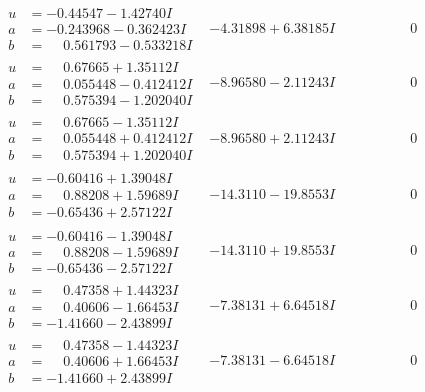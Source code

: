 \documentclass[1p]{elsarticle_modified}
\theoremstyle{definition}
\begin{document}
$$\begin{array}{c|c|c}
\begin{aligned}
u &= -0.44547 - 1.42740 I \\
a &= -0.243968 - 0.362423 I \\
b &= \phantom{-}0.561793 - 0.533218 I\end{aligned}
 & -4.31898 + 6.38185 I & \phantom{-0.000000 } 0 \\ \hline\begin{aligned}
u &= \phantom{-}0.67665 + 1.35112 I \\
a &= \phantom{-}0.055448 - 0.412412 I \\
b &= \phantom{-}0.575394 - 1.202040 I\end{aligned}
 & -8.96580 - 2.11243 I & \phantom{-0.000000 } 0 \\ \hline\begin{aligned}
u &= \phantom{-}0.67665 - 1.35112 I \\
a &= \phantom{-}0.055448 + 0.412412 I \\
b &= \phantom{-}0.575394 + 1.202040 I\end{aligned}
 & -8.96580 + 2.11243 I & \phantom{-0.000000 } 0 \\ \hline\begin{aligned}
u &= -0.60416 + 1.39048 I \\
a &= \phantom{-}0.88208 + 1.59689 I \\
b &= -0.65436 + 2.57122 I\end{aligned}
 & -14.3110 - 19.8553 I & \phantom{-0.000000 } 0 \\ \hline\begin{aligned}
u &= -0.60416 - 1.39048 I \\
a &= \phantom{-}0.88208 - 1.59689 I \\
b &= -0.65436 - 2.57122 I\end{aligned}
 & -14.3110 + 19.8553 I & \phantom{-0.000000 } 0 \\ \hline\begin{aligned}
u &= \phantom{-}0.47358 + 1.44323 I \\
a &= \phantom{-}0.40606 - 1.66453 I \\
b &= -1.41660 - 2.43899 I\end{aligned}
 & -7.38131 + 6.64518 I & \phantom{-0.000000 } 0 \\ \hline\begin{aligned}
u &= \phantom{-}0.47358 - 1.44323 I \\
a &= \phantom{-}0.40606 + 1.66453 I \\
b &= -1.41660 + 2.43899 I\end{aligned}
 & -7.38131 - 6.64518 I & \phantom{-0.000000 } 0 \\ \hline\begin{aligned}

\end{aligned}
\end{array}$$
\end{document}
